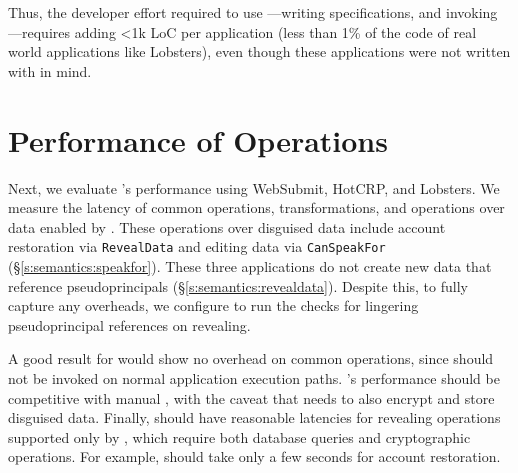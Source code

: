 Thus, the developer effort required to use \sys---writing \sys specifications,
and invoking \sys---requires adding <1k LoC per application (less than 1\% of
the code of real world applications like Lobsters), even though these
applications were not written with \sys in mind.

\section{Performance of \sys Operations}
\label{s:eval-ops}

%
Next, we evaluate \sys's performance using WebSubmit,
HotCRP, and Lobsters.
%
%
We measure the latency of common operations, \xxing transformations, and
operations over \xxed data enabled by \sys. These operations over disguised data
include account restoration via
\texttt{RevealData} and editing
\xxed data via \texttt{CanSpeakFor} (\S\ref{s:semantics:speakfor}).
%
These three applications do not create new data that reference pseudoprincipals
(\S\ref{s:semantics:revealdata}). Despite this, to fully capture any overheads, we
configure \sys to run the checks for lingering pseudoprincipal
references on revealing.
%

%
A good result for \sys would show no overhead on common operations, since \sys
should not be invoked on normal application execution paths.
%
\sys's performance should be competitive with manual \xxing, with the caveat that \sys needs
to also encrypt and store disguised data.
%
Finally, \sys should have reasonable latencies for revealing operations
supported only by \sys, which require both database queries and cryptographic
operations. For example, \sys should take only a few seconds for account
restoration.
%

